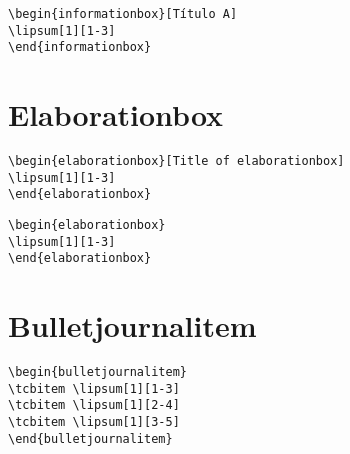 \lipsum[1][1-3]

\begin{verbatim}
\begin{informationbox}[Título A]
\lipsum[1][1-3]
\end{informationbox}
\end{verbatim}
\begin{informationbox}[Título A]
\lipsum[1][1-3]
\end{informationbox}


\section{Elaborationbox}

\lipsum[1][1-3]

\begin{verbatim}
\begin{elaborationbox}[Title of elaborationbox]
\lipsum[1][1-3]
\end{elaborationbox}
\end{verbatim}
\begin{elaborationbox}
\lipsum[1][1-3]
\end{elaborationbox}

\lipsum[1][1-3]
\begin{verbatim}
\begin{elaborationbox}
\lipsum[1][1-3]
\end{elaborationbox}
\end{verbatim}
\begin{elaborationbox}
\lipsum[1][1-3]
\end{elaborationbox}


\section{Bulletjournalitem}

\lipsum[1][1-3]

\begin{verbatim}
\begin{bulletjournalitem}
\tcbitem \lipsum[1][1-3]
\tcbitem \lipsum[1][2-4]
\tcbitem \lipsum[1][3-5]
\end{bulletjournalitem}
\end{verbatim}

\begin{bulletjournalitem}
\tcbitem \lipsum[1][1-3]
\tcbitem \lipsum[1][2-4]
\tcbitem \lipsum[1][3-5]
\end{bulletjournalitem}


